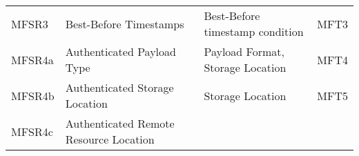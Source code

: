 \documentclass[0-thesis.tex]{subfiles}
\begin{document}
\begin{longtable}[]{@{}llll@{}}
\begin{minipage}[t]{0.16\columnwidth}
    MFSR3\strut
    \end{minipage} & \begin{minipage}[t]{0.29\columnwidth}\raggedright\strut
    Best-Before Timestamps\strut
    \end{minipage} & \begin{minipage}[t]{0.34\columnwidth}\raggedright\strut
    Best-Before timestamp condition\strut
    \end{minipage} & \begin{minipage}[t]{0.10\columnwidth}\raggedright\strut
    MFT3\strut
    \end{minipage}\tabularnewline
    \begin{minipage}[t]{0.16\columnwidth}\raggedright\strut
    MFSR4a\strut
    \end{minipage} & \begin{minipage}[t]{0.29\columnwidth}\raggedright\strut
    Authenticated Payload Type\strut
    \end{minipage} & \begin{minipage}[t]{0.34\columnwidth}\raggedright\strut
    Payload Format, Storage Location\strut
    \end{minipage} & \begin{minipage}[t]{0.10\columnwidth}\raggedright\strut
    MFT4\strut
    \end{minipage}\tabularnewline
    \begin{minipage}[t]{0.16\columnwidth}\raggedright\strut
    MFSR4b\strut
    \end{minipage} & \begin{minipage}[t]{0.29\columnwidth}\raggedright\strut
    Authenticated Storage Location\strut
    \end{minipage} & \begin{minipage}[t]{0.34\columnwidth}\raggedright\strut
    Storage Location\strut
    \end{minipage} & \begin{minipage}[t]{0.10\columnwidth}\raggedright\strut
    MFT5\strut
    \end{minipage}\tabularnewline
    \begin{minipage}[t]{0.16\columnwidth}\raggedright\strut
    MFSR4c\strut
    \end{minipage} & \begin{minipage}[t]{0.29\columnwidth}\raggedright\strut
    Authenticated Remote Resource Location\strut
    \end{minipage} & \begin{minipage}[t]{0.34\columnwidth}\raggedright\strut

\end{minipage}
\end{longtable}
\end{document}
